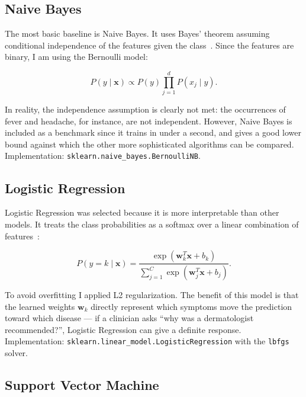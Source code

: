 \subsection{Naive Bayes}
\label{sec:naive_bayes}

The most basic baseline is Naive Bayes. It uses Bayes' theorem assuming conditional independence of the features given the class~\citep{Bishop2006}. Since the features are binary, I am using the Bernoulli model:

\begin{equation}
\label{eq:naive_bayes}
P(y \mid \mathbf{x}) \propto P(y) \prod_{j=1}^{d} P(x_j \mid y).
\end{equation}

In reality, the independence assumption is clearly not met: the occurrences of fever and headache, for instance, are not independent. However, Naive Bayes is included as a benchmark since it trains in under a second, and gives a good lower bound against which the other more sophisticated algorithms can be compared. Implementation: \texttt{sklearn.naive\_bayes.BernoulliNB}.

\subsection{Logistic Regression}
\label{sec:logistic_regression}

Logistic Regression was selected because it is more interpretable than other models. It treats the class probabilities as a softmax over a linear combination of features~\citep{Bishop2006}:

\begin{equation}
\label{eq:logistic_regression}
P(y = k \mid \mathbf{x}) = \frac{\exp(\mathbf{w}_k^T \mathbf{x} + b_k)}{\sum_{j=1}^{C} \exp(\mathbf{w}_j^T \mathbf{x} + b_j)}.
\end{equation}

To avoid overfitting I applied L2 regularization. The benefit of this model is that the learned weights $\mathbf{w}_k$ directly represent which symptoms move the prediction toward which disease --- if a clinician asks ``why was a dermatologist recommended?'', Logistic Regression can give a definite response. Implementation: \texttt{sklearn.linear\_model.LogisticRegression} with the \texttt{lbfgs} solver.

\subsection{Support Vector Machine}
\label{sec:svm}

